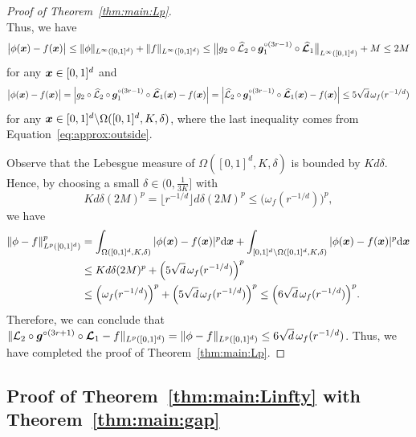 \documentclass[nohyperref]{article}
\theoremstyle{plain}
\theoremstyle{definition}
\theoremstyle{remark}
\begin{document}
\begin{proof}[Proof of Theorem~\ref{thm:main:Lp}]
\begin{equation*}
\end{equation*}
Thus, we have
\begin{equation*}
	\big|\phi({\bm{x}})-f({\bm{x}})\big|\le \|\phi\|_{L^\infty([0,1]^d)}+\|f\|_{L^\infty([0,1]^d)}\le \big\|g_2\circ {\mathcal{\widehat{L}}}_2\circ {\bm{g}}_1^{\circ (3r-1)}\circ {\bm{\mathcal{\widehat{L}}}}_1\big\|_{L^\infty([0,1]^d)}+M\le 2M
\end{equation*}
for any ${\bm{x}}\in [0,1]^d$ and 
\begin{equation*}
	\big|\phi({\bm{x}})-f({\bm{x}})\big|
	=  \Big|g_2\circ {\mathcal{\widehat{L}}}_2\circ {\bm{g}}_1^{\circ (3r-1)}\circ {\bm{\mathcal{\widehat{L}}}}_1({\bm{x}})-f({\bm{x}})\Big|
	=  \Big|{\mathcal{\widehat{L}}}_2\circ {\bm{g}}_1^{\circ (3r-1)}\circ {\bm{\mathcal{\widehat{L}}}}_1({\bm{x}})-f({\bm{x}})\Big|
	\le 5\sqrt{d}\,\omega_f(r^{-1/d})
\end{equation*}
for any ${\bm{x}}\in [0,1]^d\backslash\Omega([0,1]^d,K,\delta)$, where the last inequality comes from Equation~\eqref{eq:approx:outside}.

Observe that the Lebesgue measure of $\Omega([0,1]^d,K,\delta)$ is bounded by $Kd\delta$. Hence, by choosing a small $\delta\in (0,\tfrac{1}{3K}]$ with
\begin{equation*}
	Kd\delta(2M)^p= \lfloor r^{-1/d}\rfloor d\delta (2M)^p \le \Big(\omega_f(r^{-1/d})\Big)^p,
\end{equation*}
we have
\begin{equation*}
	\begin{split}
	\|\phi-f\|_{L^p([0,1]^d)}^p
		&=\int_{\Omega([0,1]^d,K,\delta)}|		\phi({\bm{x}})-f({\bm{x}})|^p\textnormal{d}{\bm{x}}+\int_{[0,1]^d\backslash\Omega([0,1]^d,K,\delta)}|\phi({\bm{x}})-f({\bm{x}})|^p\textnormal{d}{\bm{x}}\\
		&\le Kd\delta(2M)^p+ \Big(5\sqrt{d}\,\omega_f(r^{-1/d})\Big)^p\\
		&\le \Big(\omega_f(r^{-1/d})\Big)^p
		+ \Big(5\sqrt{d}\,\omega_f(r^{-1/d})\Big)^p
		\le \Big(6\sqrt{d}\,\omega_f(r^{-1/d})\Big)^p.
	\end{split}
\end{equation*}
Therefore, we can conclude that
$\|{\mathcal{L}}_2\circ {\bm{g}}^{\circ (3r+1)}\circ {\bm{\mathcal{L}}}_1-f\|_{L^p([0,1]^d)}=\|\phi-f\|_{L^p([0,1]^d)}\le 6\sqrt{d}\,\omega_f(r^{-1/d})$.
Thus, we have completed the proof of Theorem~\ref{thm:main:Lp}.
\end{proof}



\subsection{Proof of Theorem~\ref{thm:main:Linfty}  with Theorem~\ref{thm:main:gap}}
\label{sec:proof:main:Linfty}
\end{document}

